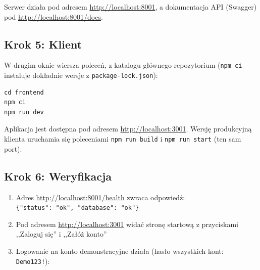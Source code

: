 Serwer działa pod adresem \url{http://localhost:8001}, a dokumentacja API (Swagger) pod \url{http://localhost:8001/docs}.

\subsection{Krok 5: Klient}

W drugim oknie wiersza poleceń, z katalogu głównego repozytorium (\texttt{npm ci} instaluje dokładnie wersje z \texttt{package-lock.json}):

\begin{lstlisting}
cd frontend
npm ci
npm run dev
\end{lstlisting}

Aplikacja jest dostępna pod adresem \url{http://localhost:3001}. Wersję produkcyjną klienta uruchamia się poleceniami \texttt{npm run build} i \texttt{npm run start} (ten sam port).

\subsection{Krok 6: Weryfikacja}

\begin{enumerate}[leftmargin=*]
    \item Adres \url{http://localhost:8001/health} zwraca odpowiedź:\\ \verb|{"status": "ok", "database": "ok"}|
    \item Pod adresem \url{http://localhost:3001} widać stronę startową z przyciskami ,,Zaloguj się'' i ,,Załóż konto''
    \item Logowanie na konto demonstracyjne działa (hasło wszystkich kont: \texttt{Demo123!}):
\end{enumerate}


